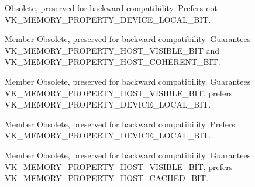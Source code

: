 \begin{DoxyRefList}
%
Obsolete, preserved for backward compatibility. Prefers not {\ttfamily VK\+\_\+\+MEMORY\+\_\+\+PROPERTY\+\_\+\+DEVICE\+\_\+\+LOCAL\+\_\+\+BIT}.  
\item[Member \doxylink{group__group__alloc_ggaa5846affa1e9da3800e3e78fae2305cca40bdf4cddeffeb12f43d45ca1286e0a5}{VMA\+\_\+\+MEMORY\+\_\+\+USAGE\+\_\+\+CPU\+\_\+\+ONLY} ]\label{deprecated__deprecated000007}%
%
Obsolete, preserved for backward compatibility. Guarantees {\ttfamily VK\+\_\+\+MEMORY\+\_\+\+PROPERTY\+\_\+\+HOST\+\_\+\+VISIBLE\+\_\+\+BIT} and {\ttfamily VK\+\_\+\+MEMORY\+\_\+\+PROPERTY\+\_\+\+HOST\+\_\+\+COHERENT\+\_\+\+BIT}.  
\item[Member \doxylink{group__group__alloc_ggaa5846affa1e9da3800e3e78fae2305cca9066b52c5a7079bb74a69aaf8b92ff67}{VMA\+\_\+\+MEMORY\+\_\+\+USAGE\+\_\+\+CPU\+\_\+\+TO\+\_\+\+GPU} ]\label{deprecated__deprecated000008}%
%
Obsolete, preserved for backward compatibility. Guarantees {\ttfamily VK\+\_\+\+MEMORY\+\_\+\+PROPERTY\+\_\+\+HOST\+\_\+\+VISIBLE\+\_\+\+BIT}, prefers {\ttfamily VK\+\_\+\+MEMORY\+\_\+\+PROPERTY\+\_\+\+DEVICE\+\_\+\+LOCAL\+\_\+\+BIT}.  
\item[Member \doxylink{group__group__alloc_ggaa5846affa1e9da3800e3e78fae2305ccac6b5dc1432d88647aa4cd456246eadf7}{VMA\+\_\+\+MEMORY\+\_\+\+USAGE\+\_\+\+GPU\+\_\+\+ONLY} ]\label{deprecated__deprecated000006}%
%
Obsolete, preserved for backward compatibility. Prefers {\ttfamily VK\+\_\+\+MEMORY\+\_\+\+PROPERTY\+\_\+\+DEVICE\+\_\+\+LOCAL\+\_\+\+BIT}.  
\item[Member \doxylink{group__group__alloc_ggaa5846affa1e9da3800e3e78fae2305cca7b586d2fdaf82a463b58f581ed72be27}{VMA\+\_\+\+MEMORY\+\_\+\+USAGE\+\_\+\+GPU\+\_\+\+TO\+\_\+\+CPU} ]\label{deprecated__deprecated000009}%
%
Obsolete, preserved for backward compatibility. Guarantees {\ttfamily VK\+\_\+\+MEMORY\+\_\+\+PROPERTY\+\_\+\+HOST\+\_\+\+VISIBLE\+\_\+\+BIT}, prefers {\ttfamily VK\+\_\+\+MEMORY\+\_\+\+PROPERTY\+\_\+\+HOST\+\_\+\+CACHED\+\_\+\+BIT}. 
\end{DoxyRefList}